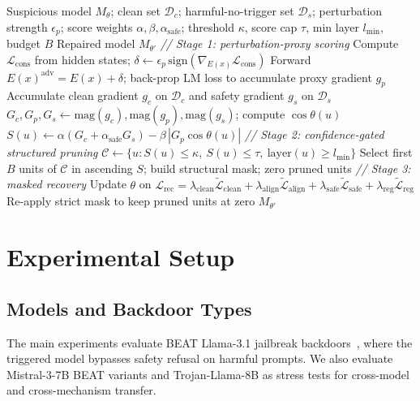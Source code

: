 \documentclass[lettersize,journal]{IEEEtran}
\begin{document}
\begin{algorithm}[!t]
\caption{Trigger-Free Confidence-Gated Pruning}
\label{alg:tfpd}
\begin{algorithmic}[1]
\REQUIRE Suspicious model $M_\theta$; clean set $\mathcal{D}_c$; harmful-no-trigger set $\mathcal{D}_s$; perturbation strength $\epsilon_p$; score weights $\alpha,\beta,\alpha_{\mathrm{safe}}$; threshold $\kappa$, score cap $\tau$, min layer $l_{\min}$, budget $B$
\ENSURE Repaired model $M_{\theta'}$
\STATE \textit{// Stage 1: perturbation-proxy scoring}
  \STATE Compute $\mathcal{L}_{\mathrm{cons}}$ from hidden states; $\delta \gets \epsilon_p\,\mathrm{sign}(\nabla_{E(x)}\mathcal{L}_{\mathrm{cons}})$
  \STATE Forward $E(x)^{\mathrm{adv}}=E(x)+\delta$; back-prop LM loss to accumulate proxy gradient $g_p$
\ENDFOR
\STATE Accumulate clean gradient $g_c$ on $\mathcal{D}_c$ and safety gradient $g_s$ on $\mathcal{D}_s$
  \STATE $G_c,G_p,G_s \gets \mathrm{mag}(g_c),\mathrm{mag}(g_p),\mathrm{mag}(g_s)$; compute $\cos\theta(u)$
  \STATE $S(u) \gets \alpha\!\left(G_c+\alpha_{\mathrm{safe}}G_s\right) - \beta\,|G_p\cos\theta(u)|$
\ENDFOR
\STATE \textit{// Stage 2: confidence-gated structured pruning}
\STATE $\mathcal{C} \gets \{u: S(u)\le\kappa,\ S(u)\le\tau,\ \mathrm{layer}(u)\ge l_{\min}\}$
\STATE Select first $B$ units of $\mathcal{C}$ in ascending $S$; build structural mask; zero pruned units
\STATE \textit{// Stage 3: masked recovery}
  \STATE Update $\theta$ on $\mathcal{L}_{\mathrm{rec}}=\lambda_{\mathrm{clean}}\widetilde{\mathcal{L}}_{\mathrm{clean}}+\lambda_{\mathrm{align}}\widetilde{\mathcal{L}}_{\mathrm{align}}+\lambda_{\mathrm{safe}}\widetilde{\mathcal{L}}_{\mathrm{safe}}+\lambda_{\mathrm{reg}}\widetilde{\mathcal{L}}_{\mathrm{reg}}$
  \STATE Re-apply strict mask to keep pruned units at zero
\ENDFOR
\RETURN $M_{\theta'}$
\end{algorithmic}
\end{algorithm}

\section{Experimental Setup}

\subsection{Models and Backdoor Types}
The main experiments evaluate BEAT Llama-3.1 jailbreak backdoors~\cite{beat}, where the triggered model bypasses safety refusal on harmful prompts. We also evaluate Mistral-3-7B BEAT variants and Trojan-Llama-8B as stress tests for cross-model and cross-mechanism transfer.
\end{document}
